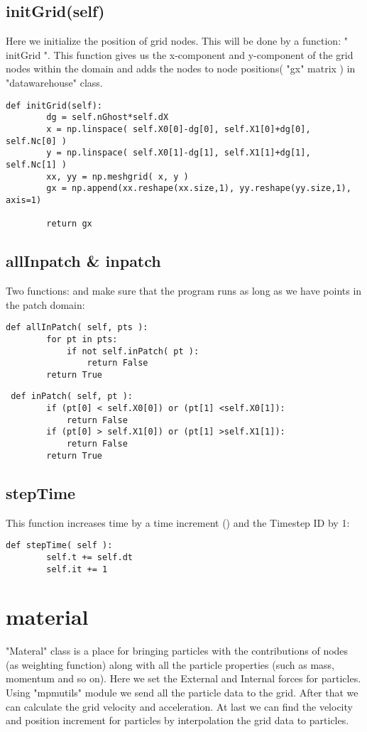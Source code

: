 \documentclass[11pt,fleqn]{book} %
\begin{document}
\section{initGrid(self)}
Here we initialize the position of grid nodes. This will be done by a function: " initGrid ". This function gives us the x-component and y-component of the grid nodes within the domain and adds the nodes to node positions( "gx" matrix ) in "datawarehouse" class.
\begin{lstlisting}
def initGrid(self):
        dg = self.nGhost*self.dX
        x = np.linspace( self.X0[0]-dg[0], self.X1[0]+dg[0], self.Nc[0] )
        y = np.linspace( self.X0[1]-dg[1], self.X1[1]+dg[1], self.Nc[1] )
        xx, yy = np.meshgrid( x, y )
        gx = np.append(xx.reshape(xx.size,1), yy.reshape(yy.size,1), axis=1)
        
        return gx
\end{lstlisting} 
\section{allInpatch \& inpatch}
Two functions:  and  make sure that the program runs as long as we have points in the patch domain:
\begin{lstlisting}
def allInPatch( self, pts ):
        for pt in pts:
            if not self.inPatch( pt ):
                return False
        return True
\end{lstlisting} 
\begin{lstlisting}
 def inPatch( self, pt ):
        if (pt[0] < self.X0[0]) or (pt[1] <self.X0[1]):
            return False
        if (pt[0] > self.X1[0]) or (pt[1] >self.X1[1]):
            return False
        return True
\end{lstlisting} 
\section{stepTime}
This function increases time by a time increment () and the Timestep ID by 1:
\begin{lstlisting}
def stepTime( self ):
        self.t += self.dt
        self.it += 1
\end{lstlisting} 
\chapter{material}
\label{chap:material}
"Materal" class is a place for bringing particles with the contributions of nodes (as weighting function) along with all the particle properties (such as mass, momentum and so on). Here we set the External and Internal forces for particles. Using "mpmutils" module we send all the particle data to the grid. After that we can calculate the grid velocity and acceleration. At last we can find the velocity and position increment for particles by interpolation the grid data to particles.
\end{document}
